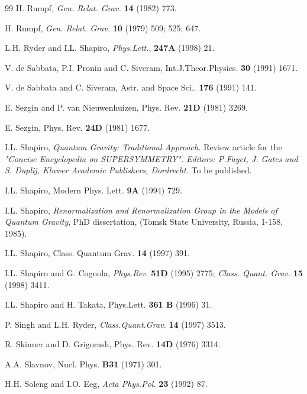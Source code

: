 \begin{thebibliography}{99}
H. Rumpf, {\sl Gen. Relat. Grav.} {\bf 14} (1982) 773.

H. Rumpf, {\sl Gen. Relat. Grav.} {\bf 10} (1979)
509; 525; 647.

L.H. Ryder and I.L. Shapiro,
{\sl Phys.Lett.}, {\bf 247A} (1998) 21.


V. de Sabbata, P.I. Pronin and C. Siveram,
Int.J.Theor.Physics. {\bf 30} (1991) 1671.

V. de Sabbata and C. Siveram,
Astr. and Space Sci.. {\bf 176} (1991) 141.

E. Sezgin and P. van Nieuwenhuizen, 
              Phys. Rev. {\bf 21D} (1981) 3269. 

E. Sezgin, Phys. Rev. {\bf 24D} (1981) 1677. 

   I.L. Shapiro, {\sl Quantum Gravity: 
Traditional Approach.} Review article for the 
{\sl "Concise Encyclopedia on SUPERSYMMETRY".
Editors: P.Fayet, J. Gates and S. Duplij, 
Kluwer Academic Publishers, Dordrecht.} To be published.

    I.L. Shapiro,
Modern Phys. Lett. {\bf 9A} (1994) 729. %

I.L. Shapiro,
{\sl Renormalization and Renormalization Group in the Models
of Quantum Gravity}, PhD dissertation, (Tomsk State University,
Russia, 1-158, 1985).

 I.L. Shapiro, Class. Quantum Grav. {\bf 14}
 (1997) 391.

I.L. Shapiro and G. Cognola, {\sl Phys.Rev}. {\bf 51D} (1995)
2775; {\sl Class. Quant. Grav.} {\bf 15} (1998) 3411.

   I.L. Shapiro and H. Takata,
 Phys.Lett. {\bf 361 B} (1996)  31.

 P. Singh and L.H. Ryder,
{\sl Class.Quant.Grav.} {\bf 14} (1997) 3513.

R. Skinner and D. Grigorash, Phys. Rev. {\bf 14D} (1976) 3314. 

 A.A. Slavnov,
{Nucl. Phys.} {\bf B31} (1971) 301.

H.H. Soleng and I.O. Eeg, {\sl Acta Phys.Pol.} {\bf 23} (1992) 87.


\end{thebibliography}
